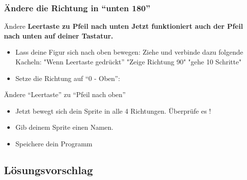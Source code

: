 \subsubsection{Ändere die Richtung in “unten 180”}
Ändere \bf{Leertaste} zu \bf{Pfeil nach unten}
Jetzt funktioniert auch der Pfeil nach unten auf deiner Tastatur. 
\begin{itemize}

\item Lass deine Figur sich nach oben bewegen: Ziehe und verbinde dazu folgende Kacheln:
\subitem "Wenn Leertaste gedrückt”
\subitem "Zeige Richtung 90"
\subitem "gehe 10 Schritte"
\item Setze die Richtung auf  “0 - Oben”:
\end{itemize}
Ändere “Leertaste” zu “Pfeil nach oben”

\begin{itemize}
\item Jetzt bewegt sich dein Sprite in alle 4 Richtungen. Überprüfe es !
\item Gib deinem Sprite einen Namen.
\item Speichere dein Programm
\end{itemize}
\subsection{Lösungsvorschlag}